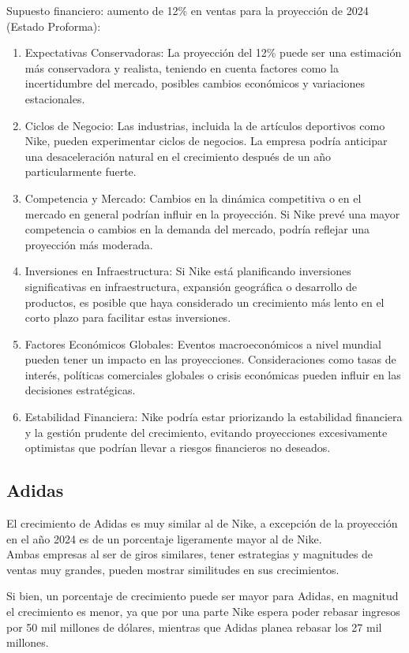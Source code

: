 \documentclass[a4paper,12pt]{article}
\begin{document}
Supuesto financiero: aumento de 12\% en ventas para la proyección de 2024 (Estado Proforma):
\begin{enumerate}
	\item Expectativas Conservadoras: La proyección del 12\% puede ser una estimación más conservadora y realista, teniendo en cuenta factores como la incertidumbre del mercado, posibles cambios económicos y variaciones estacionales.
	\item Ciclos de Negocio: Las industrias, incluida la de artículos deportivos como Nike, pueden experimentar ciclos de negocios. La empresa podría anticipar una desaceleración natural en el crecimiento después de un año particularmente fuerte.
	\item Competencia y Mercado: Cambios en la dinámica competitiva o en el mercado en general podrían influir en la proyección. Si Nike prevé una mayor competencia o cambios en la demanda del mercado, podría reflejar una proyección más moderada.
	\item Inversiones en Infraestructura: Si Nike está planificando inversiones significativas en infraestructura, expansión geográfica o desarrollo de productos, es posible que haya considerado un crecimiento más lento en el corto plazo para facilitar estas inversiones.
	\item Factores Económicos Globales: Eventos macroeconómicos a nivel mundial pueden tener un impacto en las proyecciones. Consideraciones como tasas de interés, políticas comerciales globales o crisis económicas pueden influir en las decisiones estratégicas.
	\item Estabilidad Financiera: Nike podría estar priorizando la estabilidad financiera y la gestión prudente del crecimiento, evitando proyecciones excesivamente optimistas que podrían llevar a riesgos financieros no deseados.
\end{enumerate}


\subsection{Adidas}

El crecimiento de Adidas es muy similar al de Nike, a excepción de la proyección en el año 2024 es de un porcentaje ligeramente mayor al de Nike.\\
Ambas empresas al ser de giros similares, tener estrategias y magnitudes de ventas muy grandes, pueden mostrar similitudes en sus crecimientos.

Si bien, un porcentaje de crecimiento puede ser mayor para Adidas, en magnitud el crecimiento es menor, ya que por una parte Nike espera poder rebasar ingresos por 50 mil millones de dólares, mientras que Adidas planea rebasar los 27 mil millones.
\end{document}
